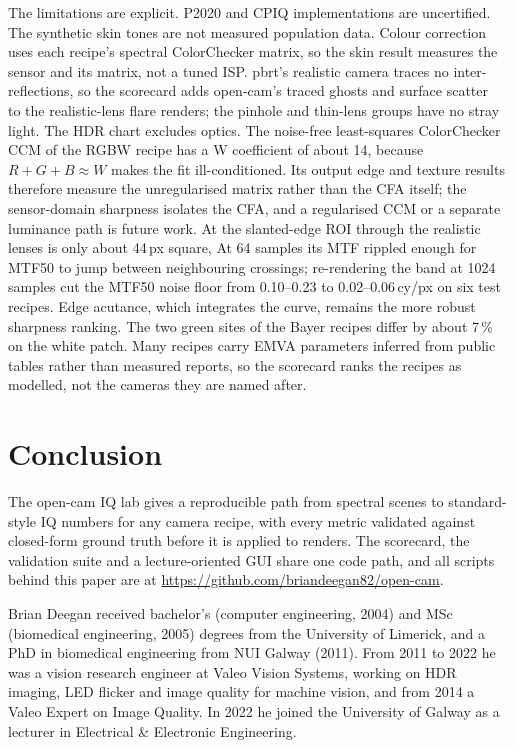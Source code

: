 \documentclass[letterpaper,twocolumn,fleqn]{article}
\begin{document}
The limitations are explicit. P2020 and CPIQ implementations are uncertified. The synthetic skin tones are not measured population data. Colour correction uses each recipe's spectral ColorChecker matrix, so the skin result measures the sensor and its matrix, not a tuned ISP. pbrt's realistic camera traces no inter-reflections, so the scorecard adds open-cam's traced ghosts and surface scatter~\cite{hullin2011flare} to the realistic-lens flare renders; the pinhole and thin-lens groups have no stray light. The HDR chart excludes optics. The noise-free least-squares ColorChecker CCM of the RGBW recipe has a W coefficient of about 14, because $R+G+B\approx W$ makes the fit ill-conditioned. Its output edge and texture results therefore measure the unregularised matrix rather than the CFA itself; the sensor-domain sharpness isolates the CFA, and a regularised CCM or a separate luminance path is future work. At \scRes{} the slanted-edge ROI through the realistic lenses is only about 44\,px square, At 64 samples its MTF rippled enough for MTF50 to jump between neighbouring crossings; re-rendering the band at 1024 samples cut the MTF50 noise floor from 0.10--0.23 to 0.02--0.06\,cy/px on six test recipes. Edge acutance, which integrates the curve, remains the more robust sharpness ranking. The two green sites of the Bayer recipes differ by about 7\,\% on the white patch. Many recipes carry EMVA parameters inferred from public tables rather than measured reports, so the scorecard ranks the recipes as modelled, not the cameras they are named after.

\section{Conclusion}
The open-cam IQ lab gives a reproducible path from spectral scenes to standard-style IQ numbers for any camera recipe, with every metric validated against closed-form ground truth before it is applied to renders. The scorecard, the validation suite and a lecture-oriented GUI share one code path, and all scripts behind this paper are at \url{https://github.com/briandeegan82/open-cam}.

\small



\begin{biography}
Brian Deegan received bachelor's (computer engineering, 2004) and MSc (biomedical engineering, 2005) degrees from the University of Limerick, and a PhD in biomedical engineering from NUI Galway (2011). From 2011 to 2022 he was a vision research engineer at Valeo Vision Systems, working on HDR imaging, LED flicker and image quality for machine vision, and from 2014 a Valeo Expert on Image Quality. In 2022 he joined the University of Galway as a lecturer in Electrical \& Electronic Engineering.
\end{biography}
\end{document}
